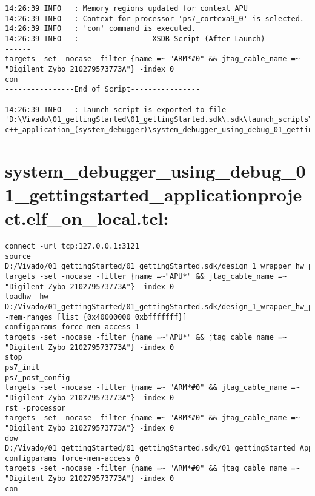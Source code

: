 \begin{lstlisting}
14:26:39 INFO	: Memory regions updated for context APU
14:26:39 INFO	: Context for processor 'ps7_cortexa9_0' is selected.
14:26:39 INFO	: 'con' command is executed.
14:26:39 INFO	: ----------------XSDB Script (After Launch)----------------
targets -set -nocase -filter {name =~ "ARM*#0" && jtag_cable_name =~ "Digilent Zybo 210279573773A"} -index 0
con
----------------End of Script----------------

14:26:39 INFO	: Launch script is exported to file 'D:\Vivado\01_gettingStarted\01_gettingStarted.sdk\.sdk\launch_scripts\xilinx_c-c++_application_(system_debugger)\system_debugger_using_debug_01_gettingstarted_applicationproject.elf_on_local.tcl'
\end{lstlisting}


\section{system\_debugger\_using\_debug\_01\_gettingstarted\_applicationproject.elf\_on\_local.tcl:}
\label{anhang:elf_on_local.tcl}
\lstset{language=plain}
\begin{lstlisting}
connect -url tcp:127.0.0.1:3121
source D:/Vivado/01_gettingStarted/01_gettingStarted.sdk/design_1_wrapper_hw_platform_0/ps7_init.tcl
targets -set -nocase -filter {name =~"APU*" && jtag_cable_name =~ "Digilent Zybo 210279573773A"} -index 0
loadhw -hw D:/Vivado/01_gettingStarted/01_gettingStarted.sdk/design_1_wrapper_hw_platform_0/system.hdf -mem-ranges [list {0x40000000 0xbfffffff}]
configparams force-mem-access 1
targets -set -nocase -filter {name =~"APU*" && jtag_cable_name =~ "Digilent Zybo 210279573773A"} -index 0
stop
ps7_init
ps7_post_config
targets -set -nocase -filter {name =~ "ARM*#0" && jtag_cable_name =~ "Digilent Zybo 210279573773A"} -index 0
rst -processor
targets -set -nocase -filter {name =~ "ARM*#0" && jtag_cable_name =~ "Digilent Zybo 210279573773A"} -index 0
dow D:/Vivado/01_gettingStarted/01_gettingStarted.sdk/01_gettingStarted_ApplicationProject/Debug/01_gettingStarted_ApplicationProject.elf
configparams force-mem-access 0
targets -set -nocase -filter {name =~ "ARM*#0" && jtag_cable_name =~ "Digilent Zybo 210279573773A"} -index 0
con
\end{lstlisting}







